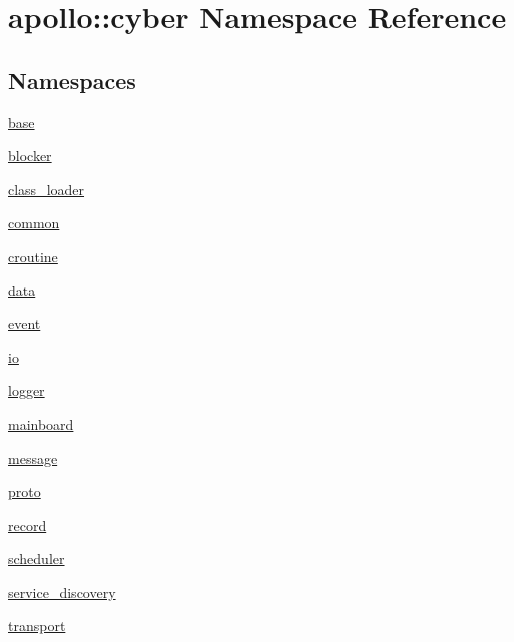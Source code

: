 \hypertarget{namespaceapollo_1_1cyber}{\section{apollo\-:\-:cyber Namespace Reference}
\label{namespaceapollo_1_1cyber}
}
\subsection*{Namespaces}
\begin{DoxyCompactItemize}
\item 
\hyperlink{namespaceapollo_1_1cyber_1_1base}{base}
\item 
\hyperlink{namespaceapollo_1_1cyber_1_1blocker}{blocker}
\item 
\hyperlink{namespaceapollo_1_1cyber_1_1class__loader}{class\-\_\-loader}
\item 
\hyperlink{namespaceapollo_1_1cyber_1_1common}{common}
\item 
\hyperlink{namespaceapollo_1_1cyber_1_1croutine}{croutine}
\item 
\hyperlink{namespaceapollo_1_1cyber_1_1data}{data}
\item 
\hyperlink{namespaceapollo_1_1cyber_1_1event}{event}
\item 
\hyperlink{namespaceapollo_1_1cyber_1_1io}{io}
\item 
\hyperlink{namespaceapollo_1_1cyber_1_1logger}{logger}
\item 
\hyperlink{namespaceapollo_1_1cyber_1_1mainboard}{mainboard}
\item 
\hyperlink{namespaceapollo_1_1cyber_1_1message}{message}
\item 
\hyperlink{namespaceapollo_1_1cyber_1_1proto}{proto}
\item 
\hyperlink{namespaceapollo_1_1cyber_1_1record}{record}
\item 
\hyperlink{namespaceapollo_1_1cyber_1_1scheduler}{scheduler}
\item 
\hyperlink{namespaceapollo_1_1cyber_1_1service__discovery}{service\-\_\-discovery}
\item 
\hyperlink{namespaceapollo_1_1cyber_1_1transport}{transport}
\end{DoxyCompactItemize}
